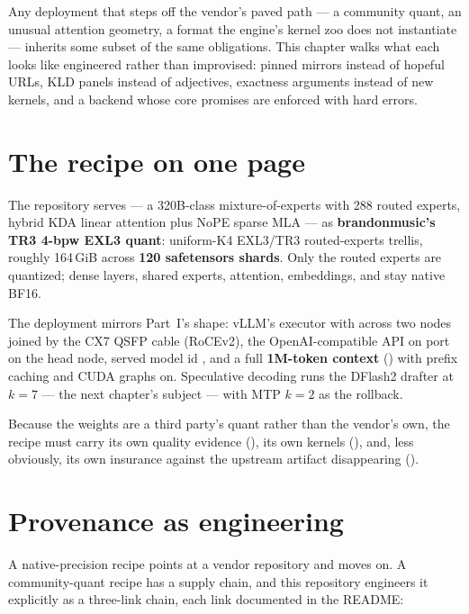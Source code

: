 Any deployment that steps off the vendor's paved path --- a community quant,
an unusual attention geometry, a format the engine's kernel zoo does not
instantiate --- inherits some subset of the same obligations. This chapter
walks what each looks like engineered rather than improvised:
pinned mirrors instead of hopeful URLs, KLD panels instead of adjectives,
exactness arguments instead of new kernels, and a backend whose core
promises are enforced with hard errors.

\section{The recipe on one page}
\label{sec:qbet-recipe}

The repository serves  --- a 320B-class mixture-of-experts
with 288 routed experts, hybrid KDA linear attention plus NoPE sparse MLA ---
as \textbf{brandonmusic's TR3 4-bpw EXL3 quant}: uniform-K4 EXL3/TR3
routed-experts trellis, roughly 164\,GiB across \textbf{120 safetensors
shards}. Only the routed experts are quantized; dense layers, shared experts,
attention, embeddings, and  stay native BF16.

The deployment mirrors Part~I's shape: vLLM's  executor with
 across two nodes joined by the CX7 QSFP cable
(RoCEv2), the OpenAI-compatible API on port  on the head node,
served model id , and a full
\textbf{1M-token context} () with prefix
caching and CUDA graphs on. Speculative decoding runs the DFlash2 drafter at
$k{=}7$ --- the next chapter's subject --- with MTP $k{=}2$ as the rollback.

Because the weights are a third party's quant rather than the vendor's own,
the recipe must carry its own quality evidence (),
its own kernels (), and, less obviously, its own insurance
against the upstream artifact disappearing ().

\section{Provenance as engineering}
\label{sec:qbet-provenance}

A native-precision recipe points at a vendor repository and moves on. A
community-quant recipe has a supply chain, and this repository engineers it
explicitly as a three-link chain, each link documented in the README:

